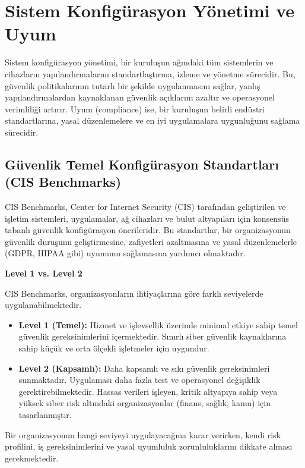 \newpage

\section{Sistem Konfigürasyon Yönetimi ve Uyum}

Sistem konfigürasyon yönetimi, bir kuruluşun ağındaki tüm sistemlerin ve cihazların yapılandırmalarını standartlaştırma, izleme ve yönetme sürecidir. Bu, güvenlik politikalarının tutarlı bir şekilde uygulanmasını sağlar, yanlış yapılandırmalardan kaynaklanan güvenlik açıklarını azaltır ve operasyonel verimliliği artırır. Uyum (compliance) ise, bir kuruluşun belirli endüstri standartlarına, yasal düzenlemelere ve en iyi uygulamalara uygunluğunu sağlama sürecidir.

\subsection{Güvenlik Temel Konfigürasyon Standartları (CIS Benchmarks)}
CIS Benchmarks, Center for Internet Security (CIS) tarafından geliştirilen ve işletim sistemleri, uygulamalar, ağ cihazları ve bulut altyapıları için konsensüs tabanlı güvenlik konfigürasyon önerileridir. Bu standartlar, bir organizasyonun güvenlik duruşunu geliştirmesine, zafiyetleri azaltmasına ve yasal düzenlemelerle (GDPR, HIPAA gibi) uyumunu sağlamasına yardımcı olmaktadır.

\textbf{Level 1 vs. Level 2}

CIS Benchmarks, organizasyonların ihtiyaçlarına göre farklı seviyelerde uygulanabilmektedir.

\begin{itemize}
    \item \textbf{Level 1 (Temel):} Hizmet ve işlevsellik üzerinde minimal etkiye sahip temel güvenlik gereksinimlerini içermektedir. Sınırlı siber güvenlik kaynaklarına sahip küçük ve orta ölçekli işletmeler için uygundur.
    \item \textbf{Level 2 (Kapsamlı):} Daha kapsamlı ve sıkı güvenlik gereksinimleri sunmaktadır. Uygulaması daha fazla test ve operasyonel değişiklik gerektirebilmektedir. Hassas verileri işleyen, kritik altyapıya sahip veya yüksek siber risk altındaki organizasyonlar (finans, sağlık, kamu) için tasarlanmıştır.
\end{itemize}

Bir organizasyonun hangi seviyeyi uygulayacağına karar verirken, kendi risk profilini, iş gereksinimlerini ve yasal uyumluluk zorunluluklarını dikkate alması gerekmektedir.

